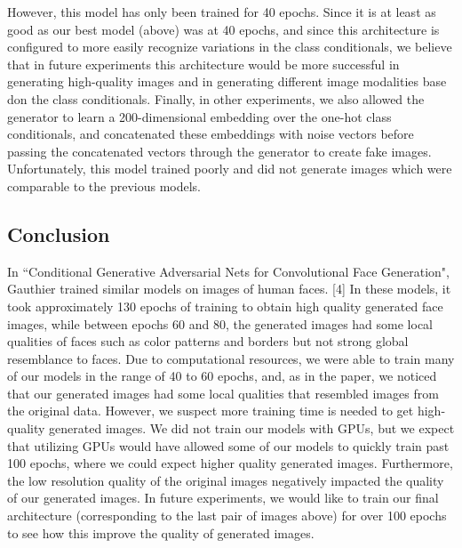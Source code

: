 \documentclass[a4paper]{article}
\begin{document}
However, this model has only been trained for 40 epochs. Since it is at least as good as our best model (above) was at 40 epochs, and since this architecture is configured to more easily recognize variations in the class conditionals, we believe that in future experiments this architecture would be more successful in generating high-quality images and in generating different image modalities base don the class conditionals.
\newline
\newline
Finally, in other experiments, we also allowed the generator to learn a 200-dimensional embedding over the one-hot class conditionals, and concatenated these embeddings with noise vectors before passing the concatenated vectors through the generator to create fake images. Unfortunately, this model trained poorly and did not generate images which were comparable to the previous models. 
\subsection*{Conclusion}
In ``Conditional Generative Adversarial Nets for Convolutional Face Generation", Gauthier trained similar models on images of human faces. [4] In these models, it took approximately 130 epochs of training to obtain high quality generated face images, while between epochs 60 and 80, the generated images had some local qualities of faces such as color patterns and borders but not strong global resemblance to faces. Due to computational resources, we were able to train many of our models in the range of 40 to 60 epochs, and, as in the paper, we noticed that our generated images had some local qualities that resembled images from the original data.
\newline
\newline
However, we suspect more training time is needed to get high-quality generated images. We did not train our models with GPUs, but we expect that utilizing GPUs would have allowed some of our models to quickly train past 100 epochs, where we could expect higher quality generated images. Furthermore, the low resolution quality of the original images negatively impacted the quality of our generated images. In future experiments, we would like to train our final architecture (corresponding to the last pair of images above) for over 100 epochs to see how this improve the quality of generated images.
\end{document}
